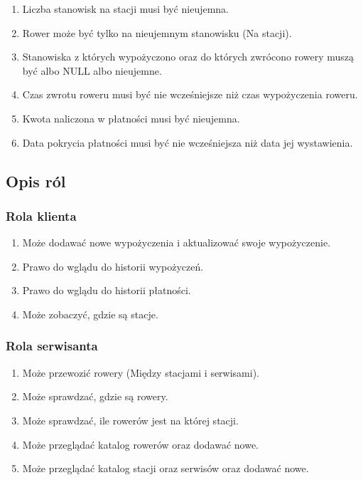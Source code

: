 \documentclass{article}
\begin{document}
\begin{enumerate}
	\item Liczba stanowisk na stacji musi być nieujemna.
	\item Rower może być tylko na nieujemnym stanowisku (Na stacji).
	\item Stanowiska z których wypożyczono oraz do których zwrócono rowery muszą być albo NULL albo nieujemne.
	\item Czas zwrotu roweru musi być nie wcześniejsze niż czas wypożyczenia roweru.
	\item Kwota naliczona w płatności musi być nieujemna.
	\item Data pokrycia płatności musi być nie wcześniejsza niż data jej wystawienia.
\end{enumerate}

\subsection{Opis ról}
\subsubsection{Rola klienta}
\begin{enumerate}
	\item Może dodawać nowe wypożyczenia i aktualizować swoje wypożyczenie.
	\item Prawo do wglądu do historii wypożyczeń.
	\item Prawo do wglądu do historii płatności.
	\item Może zobaczyć, gdzie są stacje.
\end{enumerate}

\subsubsection{Rola serwisanta}
\begin{enumerate}
	\item Może przewozić rowery (Między stacjami i serwisami).
	\item Może sprawdzać, gdzie są rowery.
	\item Może sprawdzać, ile rowerów jest na której stacji.
	\item Może przeglądać katalog rowerów oraz dodawać nowe.
	\item Może przeglądać katalog stacji oraz serwisów oraz dodawać nowe.
\end{enumerate}
\end{document}
